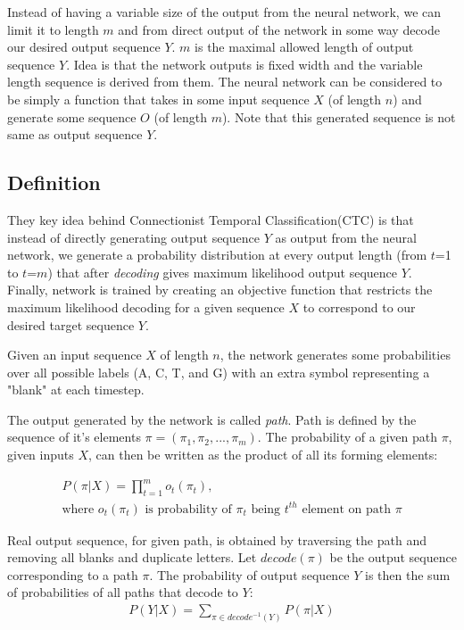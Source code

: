 \documentclass[times, utf8, diplomski, numeric, english]{fer}
\begin{document}
Instead of having a variable size of the output from the neural network, we can limit it to length $m$ and from direct output of the network in some way decode our desired output sequence $Y$. $m$ is the maximal allowed length of output sequence $Y$.
Idea is that the network outputs is fixed width and the variable length sequence is derived from them.
The neural network can be considered to be simply a function that takes in some input sequence $X$ (of length $n$) and generate some sequence $O$ (of length $m$). Note that this generated sequence is not same as output sequence $Y$. 

\subsection{Definition}
They key idea behind Connectionist Temporal Classification(CTC)\cite{Graves:2006:CTC:1143844.1143891} is that instead of directly generating output sequence $Y$ as output from the neural network, we  generate a probability distribution at every output length (from $t$=1 to $t$=$m$) that after \textit{decoding} gives maximum likelihood output sequence $Y$. 
Finally, network is trained by creating an objective function that restricts the maximum likelihood decoding for a given sequence $X$ to correspond to our desired target sequence $Y$.


Given an input sequence $X$ of length $n$, the network generates some probabilities over all possible labels (A, C, T, and G) with an extra symbol representing a "blank" at each timestep. 

The output generated by the network is called \textit{path}. Path is defined by the sequence of it's elements $\pi = (\pi_1, \pi_2, ..., \pi_m)$.
The probability of a given path $\pi$, given inputs $X$, can then be written as the product of all its forming elements:

\begin{equation}
\begin{gathered}
P(\pi | X) = \prod_{t=1}^{m} o_t(\pi_t), \\
\text{where $o_t(\pi_t)$ is probability of $\pi_t$ being $t^{th}$ element on path $\pi$}
\end{gathered}
\end{equation}

Real output sequence, for given path, is obtained by traversing the path and removing all blanks and duplicate letters. Let $ decode(\pi) $ be the output sequence corresponding to a path $\pi$. The probability of output sequence $Y$ is then the sum of probabilities of all paths that decode to $Y$:
\begin{equation}
\begin{gathered}
P(Y | X) = \sum_{\pi \in decode^{-1}(Y)}^{} P(\pi | X)
\end{gathered}
\end{equation}
\end{document}
